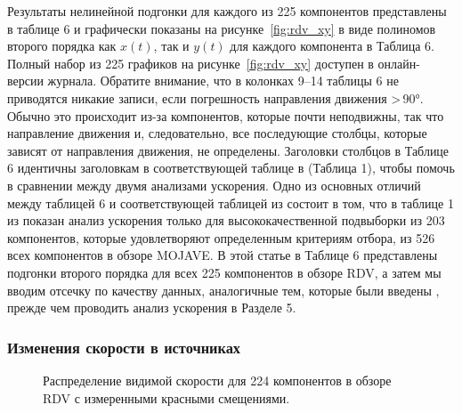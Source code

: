 Результаты нелинейной подгонки для каждого из 225 компонентов представлены в таблице 6 и графически
показаны на рисунке~\ref{fig:rdv_xy} в виде полиномов второго порядка как $x(t)$, так и $y(t)$ для
каждого компонента в Таблица 6. Полный набор из 225 графиков на рисунке~\ref{fig:rdv_xy} доступен в
онлайн-версии журнала. Обратите внимание, что в колонках 9--14 таблицы 6 не приводятся никакие
записи, если погрешность направления движения >\,\ang{90}. Обычно это происходит
из-за компонентов, которые почти неподвижны, так что направление движения и, следовательно, все
последующие столбцы, которые зависят от направления движения, не определены. Заголовки столбцов в
Таблице 6 идентичны заголовкам в соответствующей таблице в \cite{Homan_2009} (Таблица 1), чтобы
помочь в сравнении между двумя анализами ускорения. Одно из основных отличий между таблицей 6 и
соответствующей таблицей из \cite{Homan_2009} состоит в том, что в таблице 1 из \cite{Homan_2009}
показан анализ ускорения только для высококачественной подвыборки из 203 компонентов, которые
удовлетворяют определенным критериям отбора, из 526 всех компонентов в обзоре MOJAVE. В этой статье
в Таблице 6 представлены подгонки второго порядка для всех 225 компонентов в обзоре RDV, а затем
мы вводим отсечку по качеству данных, аналогичные тем, которые были введены \cite{Homan_2009},
прежде чем проводить анализ ускорения в Разделе 5.

\subsubsection{Изменения скорости в источниках}

\begin{figure}[tbh]
 \caption{Распределение видимой скорости для 224 компонентов в обзоре RDV с измеренными красными
смещениями.}
 \label{fig:rdv_app_speed_distrib}
\end{figure}

